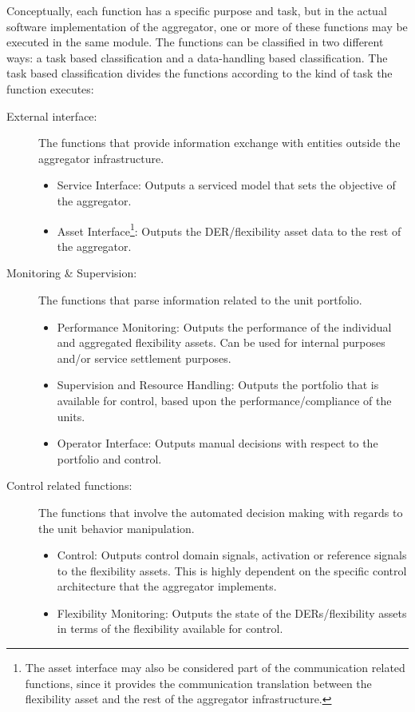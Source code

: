 Conceptually, each function has a specific purpose and task, but in the actual software implementation of the aggregator, one or more of these functions may be executed in the same module. The functions can be classified in two different ways: a task based classification and a data-handling based classification. The task based classification divides the functions according to the kind of task the function executes:
\begin{description}
	\item[External interface:] The functions that provide information exchange with entities outside the aggregator infrastructure.
		\begin{itemize}
			\item Service Interface: Outputs a serviced model that sets the objective of the aggregator.
			\item Asset Interface\footnote{The asset interface may also be considered part of the communication related functions, since it provides the communication translation between the flexibility asset and the rest of the aggregator infrastructure.}: Outputs the DER/flexibility asset data to the rest of the aggregator.
		\end{itemize}
	\item[Monitoring \& Supervision:] The functions that parse information related to the unit portfolio.
		\begin{itemize}
			\item Performance Monitoring: Outputs the performance of the individual and aggregated flexibility assets. Can be used for internal purposes and/or service settlement purposes.
			\item Supervision and Resource Handling: Outputs the portfolio that is available for control, based upon the performance/compliance of the units.
			\item Operator Interface: Outputs manual decisions with respect to the portfolio and control.
		\end{itemize}
	\item[Control related functions:] The functions that involve the automated decision making with regards to the unit behavior manipulation.
		\begin{itemize}
			\item Control: Outputs control domain signals, \eg activation or reference signals to the flexibility assets. This is highly dependent on the specific control architecture that the aggregator implements.
			\item Flexibility Monitoring: Outputs the state of the DERs/flexibility assets in terms of the flexibility available for control.

\end{itemize}
\end{description}
